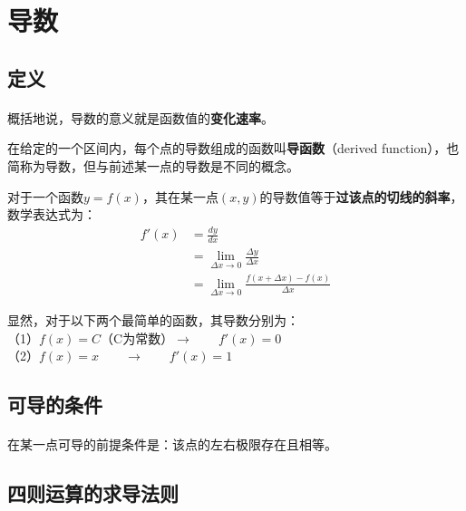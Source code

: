 
%
%

\section{导数}

\subsection{定义}

\paragraph{\quad}

概括地说，导数的意义就是函数值的\textbf{变化速率}。

在给定的一个区间内，每个点的导数组成的函数叫\textbf{导函数}（derived function），也简称为导数，但与前述某一点的导数是不同的概念。

对于一个函数$y = f(x)$，其在某一点$(x, y)$的导数值等于\textbf{过该点的切线的斜率}，数学表达式为：\\

\begin{equation*}
\begin{aligned}
f'(x) & = \frac{dy}{dx}\\
& = \lim_{\Delta x \to 0}\frac{\Delta y}{\Delta x}\\
& = \lim_{\Delta x \to 0}\frac{f(x + \Delta x) - f(x)}{\Delta x}
\end{aligned}
\end{equation*}

显然，对于以下两个最简单的函数，其导数分别为：\\
（1）$f(x) = C$（C为常数）\qquad $\to \qquad f'(x) = 0$\\
（2）$f(x) = x \qquad \to \qquad f'(x) = 1$

\subsection{可导的条件}

\paragraph{\quad}

在某一点可导的前提条件是：该点的左右极限存在且相等。

\subsection{四则运算的求导法则}

